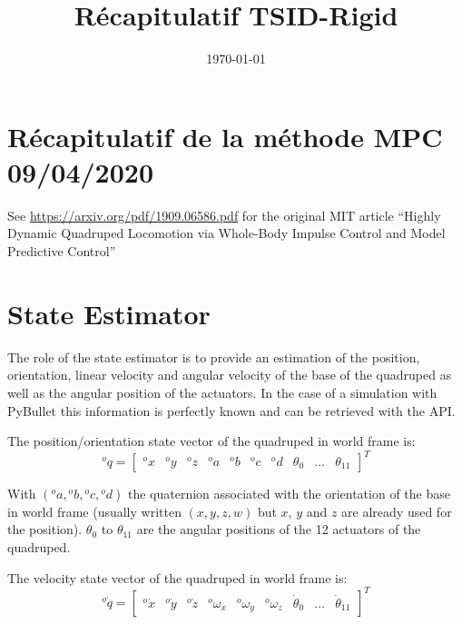 \documentclass[a4paper,11pt]{article}
\title{Récapitulatif TSID-Rigid}
\author{}
\date{\today}
\newcommand{\PRLsep}{\noindent\makebox[\linewidth]{\resizebox{0.3333\linewidth}{1pt}{$\bullet$}}}%
\begin{document}

\section*{Récapitulatif de la méthode MPC 09/04/2020}

\vspace{0.8cm}
\PRLsep
\vspace{0.5cm}

See \url{https://arxiv.org/pdf/1909.06586.pdf} for the original MIT article ``Highly Dynamic Quadruped Locomotion via Whole-Body Impulse Control and Model Predictive Control''

\section{State Estimator}

The role of the state estimator is to provide an estimation of the position, orientation, linear velocity and angular velocity of the base of the quadruped as well as the angular position of the actuators. In the case of a simulation with PyBullet this information is perfectly known and can be retrieved with the API.

The position/orientation state vector of the quadruped in world frame is:
\begin{equation}
{}^o\!q = \begin{bmatrix} {}^o\!x & {}^o\!y & {}^o\!z & {}^o\!a & {}^o\!b & {}^o\!c & {}^o\!d & \theta_0 & \dots & \theta_{11} \end{bmatrix}^T
\end{equation}

With $({}^o\!a,{}^o\!b,{}^o\!c,{}^o\!d)$ the quaternion associated with the orientation of the base in world frame (usually written $(x,y,z,w)$ but $x$, $y$ and $z$ are already used for the position). $\theta_{0}$ to $\theta_{11}$ are the angular positions of the 12 actuators of the quadruped.

The velocity state vector of the quadruped in world frame is:
\begin{equation}
{}^o\!\dot q = \begin{bmatrix} {}^o\!\dot x & {}^o\!\dot y & {}^o\!\dot z & {}^o\!\omega_x & {}^o\!\omega_y & {}^o\!\omega_z & \dot \theta_0 & \dots & \dot \theta_{11} \end{bmatrix}^T
\end{equation}
\end{document}
